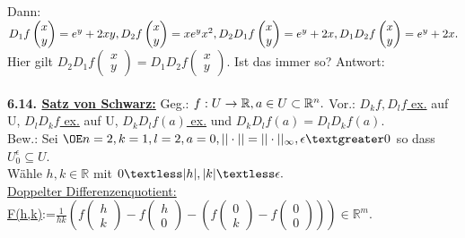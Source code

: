 \documentclass[]{scrartcl}
\begin{document}
Dann: $D_1f\begin{pmatrix}
	x\\y
\end{pmatrix}=e^y+2xy, D_2f\begin{pmatrix}
	x\\y
\end{pmatrix}=xe^yx^2,\\
D_2D_1f\begin{pmatrix}
	x\\y
\end{pmatrix}=e^y+2x, D_1D_2f\begin{pmatrix}
	x\\y
\end{pmatrix}=e^y+2x.$\\
Hier gilt $D_2D_1f\begin{pmatrix}
	x\\y
\end{pmatrix}=D_1D_2f\begin{pmatrix}
	x\\y
\end{pmatrix}.$ Ist das immer so? Antwort:\\
\\
\textbf{6.14. \ul{Satz von Schwarz:}} Geg.: $f:U\rightarrow\mathbb{R}, a \in U 
\subset \mathbb{R}^n.\\$
Vor.:  \ul{$D_kf,D_l f$ ex.} auf U, \ul{$D_l D_k f$ ex.} auf 
U, \ul{$D_kD_lf(a)$ ex.} und \ul{$D_kD_lf(a)=D_lD_kf(a)$}.\\
Bew.: Sei $\OE n=2, k=1, l=2, a=0, ||\cdot||=||\cdot||_\infty, 
\epsilon\textgreater 0$ so dass $U_0^\epsilon\subseteq U.$\\
Wähle $h,k\in \mathbb{R}$ mit $0\textless |h|,|k|\textless\epsilon.$\\
\ul{Doppelter Differenzenquotient:}\\
\ul{F(h,k)}:=$\frac{1}{hk}(f\begin{pmatrix}
	h\\k
\end{pmatrix}-f\begin{pmatrix}
	h\\0
\end{pmatrix}-(f\begin{pmatrix}
	0\\k
\end{pmatrix}-f\begin{pmatrix}
	0\\0
\end{pmatrix}))\in \mathbb{R}^m.$\\
\end{document}
